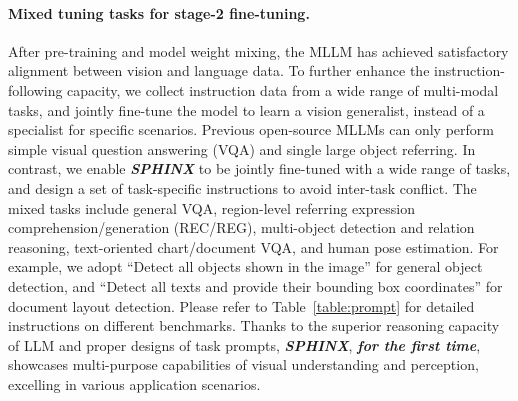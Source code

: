 \documentclass{article} \usepackage{iclr2024_conference,times}
\begin{document}
\paragraph{Mixed tuning tasks for stage-2 fine-tuning.} After pre-training and model weight mixing, the MLLM has achieved satisfactory alignment between vision and language data. To further enhance the instruction-following capacity, we collect instruction data from a wide range of multi-modal tasks, and jointly fine-tune the model to learn a vision generalist, instead of a specialist for specific scenarios. 
Previous open-source MLLMs can only perform simple visual question answering (VQA) and single large object referring. In contrast, we enable \textcolor{Goldenrod3}{\textbf{\textit{SPHINX}}} to be jointly fine-tuned with a wide range of tasks, and design a set of task-specific instructions to avoid inter-task conflict. 
The mixed tasks include general VQA, region-level referring expression comprehension/generation (REC/REG), multi-object detection and relation reasoning, text-oriented chart/document VQA, and human pose estimation. 
For example, we adopt ``Detect all objects shown in the image'' for general object detection, and ``Detect all texts and provide their bounding box coordinates'' for document layout detection. Please refer to Table~\ref{table:prompt} for detailed instructions on different benchmarks.
Thanks to the superior reasoning capacity of LLM and proper designs of task prompts, \textcolor{Goldenrod3}{\textbf{\textit{SPHINX}}}, \textit{\textbf{for the first time}}, showcases multi-purpose capabilities of visual understanding and perception, excelling in various application scenarios. 
\end{document}
